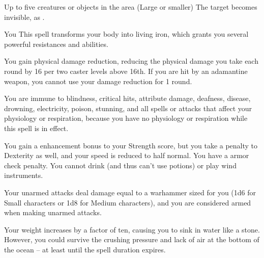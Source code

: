 \begin{spellheader}
    \spelldur{\durshort \dismissable}
\end{spellheader}
\begin{spelleffects}
    \begin{spelltargets}{Up to five creatures or objects in the area (Large or smaller)}
        \spelleffect The target becomes invisible, as .
    \end{spelltargets}
\end{spelleffects}
\begin{spellfooter}
    
\end{spellfooter}

\begin{spellheader}
    \spelldur{\durshort \dismissable}
\end{spellheader}
\begin{spelleffects}
    \begin{spelltarget}{You}
        \spelleffect This spell transforms your body into living iron, which grants you several powerful resistances and abilities.
        \par You gain physical damage reduction, reducing the physical damage you take each round by 16  per two caster levels above 16th. If you are hit by an adamantine weapon, you cannot use your damage reduction for 1 round.
        \par You are immune to blindness, critical hits, attribute damage, deafness, disease, drowning, electricity, poison, stunning, and all spells or attacks that affect your physiology or respiration, because you have no physiology or respiration while this spell is in effect.
        \par You gain a  enhancement bonus to your Strength score, but you take a  penalty to Dexterity as well, and your speed is reduced to half normal. You have a  armor check penalty. You cannot drink (and thus can't use potions) or play wind instruments.
        \par Your unarmed attacks deal damage equal to a warhammer sized for you (1d6 for Small characters or 1d8 for Medium characters), and you are considered armed when making unarmed attacks.
        \par Your weight increases by a factor of ten, causing you to sink in water like a stone. However, you could survive the crushing pressure and lack of air at the bottom of the ocean -- at least until the spell duration expires.
    \end{spelltarget}
\end{spelleffects}
\begin{spellfooter}
    
\end{spellfooter}


